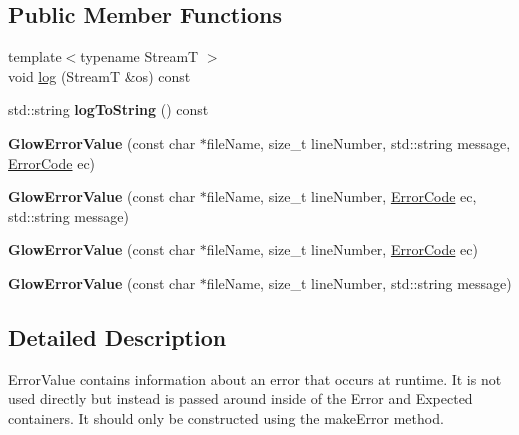\subsection*{Public Member Functions}
\begin{DoxyCompactItemize}
\item 
{\footnotesize template$<$typename StreamT $>$ }\\void \hyperlink{classglow_1_1detail_1_1_glow_error_value_adf50591b65a36cc2aed5c8b0f558e66b}{log} (StreamT \&os) const
\item 
\mbox{\label{classglow_1_1detail_1_1_glow_error_value_a0b193e2755da83e0e94b4ad5ae4e2b70}} 
std\+::string {\bfseries log\+To\+String} () const
\item 
\mbox{\label{classglow_1_1detail_1_1_glow_error_value_abfd1d812881c11f593283ca6eac76672}} 
{\bfseries Glow\+Error\+Value} (const char $\ast$file\+Name, size\+\_\+t line\+Number, std\+::string message, \hyperlink{classglow_1_1detail_1_1_glow_error_value_a0c0ed8bba0a9859c023dd4b9b5233c37}{Error\+Code} ec)
\item 
\mbox{\label{classglow_1_1detail_1_1_glow_error_value_a4a812fd8c4575ab80b48a187b576c641}} 
{\bfseries Glow\+Error\+Value} (const char $\ast$file\+Name, size\+\_\+t line\+Number, \hyperlink{classglow_1_1detail_1_1_glow_error_value_a0c0ed8bba0a9859c023dd4b9b5233c37}{Error\+Code} ec, std\+::string message)
\item 
\mbox{\label{classglow_1_1detail_1_1_glow_error_value_aa7aeb86470ec77389b3db8139b2c4f2e}} 
{\bfseries Glow\+Error\+Value} (const char $\ast$file\+Name, size\+\_\+t line\+Number, \hyperlink{classglow_1_1detail_1_1_glow_error_value_a0c0ed8bba0a9859c023dd4b9b5233c37}{Error\+Code} ec)
\item 
\mbox{\label{classglow_1_1detail_1_1_glow_error_value_ad525c1b6c1263d66b1d5a275a292d54c}} 
{\bfseries Glow\+Error\+Value} (const char $\ast$file\+Name, size\+\_\+t line\+Number, std\+::string message)
\end{DoxyCompactItemize}


\subsection{Detailed Description}
Error\+Value contains information about an error that occurs at runtime. It is not used directly but instead is passed around inside of the Error and Expected containers. It should only be constructed using the make\+Error method. 

